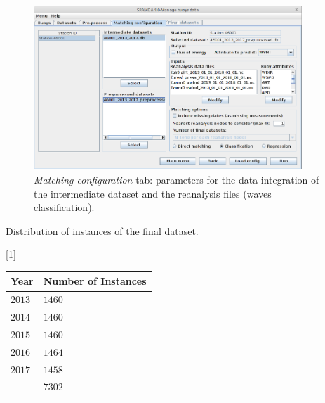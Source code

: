 \documentclass[energies,article,accept,moreauthors,pdftex]{Definitions/mdpi}
\begin{document}
\begin{figure}[H]
				\widefigure
				\includegraphics[width=0.90\textwidth]{figures/FigureMatching_configuration.png}
				\caption{\textit{Matching configuration} tab: parameters for the data integration of the intermediate dataset and the reanalysis files (waves classification).}\label{fig:matching_conf_wc}
			\end{figure}
\begin{paracol}{2}
\switchcolumn
\vspace{-6pt}

	
			
		    \begin{specialtable}[H]
					\caption{Distribution of instances of the final dataset.}
					\label{tab:datasetDistribution}
					\setlength{\cellWidtha}{\columnwidth/2-2\tabcolsep+0.0in}
\setlength{\cellWidthb}{\columnwidth/2-2\tabcolsep+0.0in}
\scalebox{1}[1]{\begin{tabularx}{\columnwidth}{>{\PreserveBackslash\centering}m{\cellWidtha}>{\PreserveBackslash\centering}m{\cellWidthb}}
\toprule
						\textbf{Year}&\textbf{Number of Instances}\\
						\midrule
						$2013$&$1460$\\
						$2014$&$1460$\\
						$2015$&$1460$\\
						$2016$&$1464$\\
						$2017$&$1458$\\
						\midrule
						&$7302$\\
						\bottomrule
					\end{tabularx}}
				\end{specialtable}
			\vspace{-6pt}	
			
				\newpage	
\end{paracol}
\end{document}
